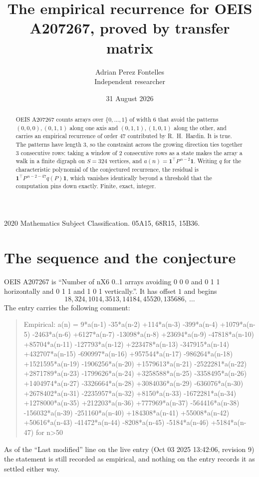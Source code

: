 \documentclass[11pt,a4paper]{article}
\title{The empirical recurrence for OEIS A207267, proved by transfer matrix}
\author{Adrian Perez Fontelles\\ \small Independent researcher}
\date{31 August 2026}
\theoremstyle{plain}
\theoremstyle{definition}
\begin{document}
\maketitle

\begin{abstract}
OEIS A207267 counts arrays over $\{0,\dots,1\}$ of width $6$ that avoid the patterns
$(0,0,0), (0,1,1)$ along one axis and $(0,1,1), (1,0,1)$ along the other, and carries an empirical recurrence of
order $47$ contributed by R.~H.~Hardin. It is true. The patterns have length $3$, so
the constraint across the growing direction ties together $3$ consecutive rows: taking a
window of $2$ consecutive rows as a state makes the array a walk in a finite digraph
on $S=324$ vertices, and $a(n)=\mathbf{1}^{\!\top}P^{\,n-2}\mathbf{1}$. Writing $q$
for the characteristic polynomial of the conjectured recurrence, the residual is
$\mathbf{1}^{\!\top}P^{\,n-2-47}q(P)\mathbf{1}$, which vanishes identically
beyond a threshold that the computation pins down exactly. Finite, exact, integer.
\end{abstract}

\noindent\small 2020 Mathematics Subject Classification. 05A15, 68R15, 15B36.\normalsize

\section{The sequence and the conjecture}

OEIS A207267 is ``Number of nX6 0..1 arrays avoiding 0 0 0 and 0 1 1 horizontally and 0 1 1 and 1 0 1 vertically.''. It has offset
$1$ and begins
\[
18, 324, 1014, 3513, 14184, 45520, 135686,\ \dots
\]
The entry carries the following comment:
\begin{quote}\small
Empirical: a(n) = 9*a(n-1) -35*a(n-2) +114*a(n-3) -399*a(n-4) +1079*a(n-5) -2463*a(n-6) +6127*a(n-7) -13098*a(n-8) +23694*a(n-9) -47818*a(n-10) +85704*a(n-11) -127793*a(n-12) +223478*a(n-13) -347915*a(n-14) +432707*a(n-15) -690997*a(n-16) +957544*a(n-17) -986264*a(n-18) +1521595*a(n-19) -1906256*a(n-20) +1579613*a(n-21) -2522281*a(n-22) +2871789*a(n-23) -1799626*a(n-24) +3258588*a(n-25) -3358495*a(n-26) +1404974*a(n-27) -3326664*a(n-28) +3084036*a(n-29) -636076*a(n-30) +2678402*a(n-31) -2235957*a(n-32) +8150*a(n-33) -1672281*a(n-34) +1278000*a(n-35) +212203*a(n-36) +777969*a(n-37) -564416*a(n-38) -156032*a(n-39) -251160*a(n-40) +184308*a(n-41) +55008*a(n-42) +50616*a(n-43) -41472*a(n-44) -8208*a(n-45) -5184*a(n-46) +5184*a(n-47) for n>50
\end{quote}
As of the ``Last modified'' line on the live entry (Oct 03 2025 13:42:06, revision
9) the statement is still recorded as empirical, and nothing on the entry
records it as settled either way.
\end{document}
